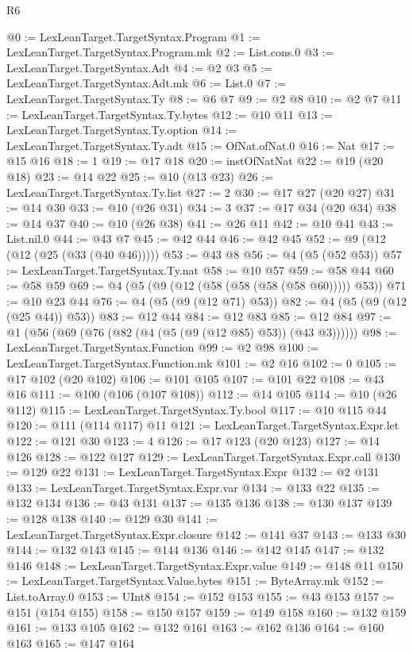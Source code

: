 \begin{lexlean}{R6}
\begin{coremodule}
@0 := LexLeanTarget.TargetSyntax.Program
@1 := LexLeanTarget.TargetSyntax.Program.mk
@2 := List.cons.{0}
@3 := LexLeanTarget.TargetSyntax.Adt
@4 := @2 @3
@5 := LexLeanTarget.TargetSyntax.Adt.mk
@6 := List.{0}
@7 := LexLeanTarget.TargetSyntax.Ty
@8 := @6 @7
@9 := @2 @8
@10 := @2 @7
@11 := LexLeanTarget.TargetSyntax.Ty.bytes
@12 := @10 @11
@13 := LexLeanTarget.TargetSyntax.Ty.option
@14 := LexLeanTarget.TargetSyntax.Ty.adt
@15 := OfNat.ofNat.{0}
@16 := Nat
@17 := @15 @16
@18 := 1
@19 := @17 @18
@20 := instOfNatNat
@22 := @19 (@20 @18)
@23 := @14 @22
@25 := @10 (@13 @23)
@26 := LexLeanTarget.TargetSyntax.Ty.list
@27 := 2
@30 := @17 @27 (@20 @27)
@31 := @14 @30
@33 := @10 (@26 @31)
@34 := 3
@37 := @17 @34 (@20 @34)
@38 := @14 @37
@40 := @10 (@26 @38)
@41 := @26 @11
@42 := @10 @41
@43 := List.nil.{0}
@44 := @43 @7
@45 := @42 @44
@46 := @42 @45
@52 := @9 (@12 (@12 (@25 (@33 (@40 @46)))))
@53 := @43 @8
@56 := @4 (@5 (@52 @53))
@57 := LexLeanTarget.TargetSyntax.Ty.nat
@58 := @10 @57
@59 := @58 @44
@60 := @58 @59
@69 := @4 (@5 (@9 (@12 (@58 (@58 (@58 (@58 @60))))) @53))
@71 := @10 @23 @44
@76 := @4 (@5 (@9 (@12 @71) @53))
@82 := @4 (@5 (@9 (@12 (@25 @44)) @53))
@83 := @12 @44
@84 := @12 @83
@85 := @12 @84
@97 := @1 (@56 (@69 (@76 (@82 (@4 (@5 (@9 (@12 @85) @53)) (@43 @3))))))
@98 := LexLeanTarget.TargetSyntax.Function
@99 := @2 @98
@100 := LexLeanTarget.TargetSyntax.Function.mk
@101 := @2 @16
@102 := 0
@105 := @17 @102 (@20 @102)
@106 := @101 @105
@107 := @101 @22
@108 := @43 @16
@111 := @100 (@106 (@107 @108))
@112 := @14 @105
@114 := @10 (@26 @112)
@115 := LexLeanTarget.TargetSyntax.Ty.bool
@117 := @10 @115 @44
@120 := @111 (@114 @117) @11
@121 := LexLeanTarget.TargetSyntax.Expr.let
@122 := @121 @30
@123 := 4
@126 := @17 @123 (@20 @123)
@127 := @14 @126
@128 := @122 @127
@129 := LexLeanTarget.TargetSyntax.Expr.call
@130 := @129 @22
@131 := LexLeanTarget.TargetSyntax.Expr
@132 := @2 @131
@133 := LexLeanTarget.TargetSyntax.Expr.var
@134 := @133 @22
@135 := @132 @134
@136 := @43 @131
@137 := @135 @136
@138 := @130 @137
@139 := @128 @138
@140 := @129 @30
@141 := LexLeanTarget.TargetSyntax.Expr.closure
@142 := @141 @37
@143 := @133 @30
@144 := @132 @143
@145 := @144 @136
@146 := @142 @145
@147 := @132 @146
@148 := LexLeanTarget.TargetSyntax.Expr.value
@149 := @148 @11
@150 := LexLeanTarget.TargetSyntax.Value.bytes
@151 := ByteArray.mk
@152 := List.toArray.{0}
@153 := UInt8
@154 := @152 @153
@155 := @43 @153
@157 := @151 (@154 @155)
@158 := @150 @157
@159 := @149 @158
@160 := @132 @159
@161 := @133 @105
@162 := @132 @161
@163 := @162 @136
@164 := @160 @163
@165 := @147 @164

\end{coremodule}
\end{lexlean}
